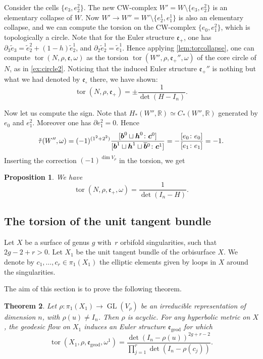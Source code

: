 \documentclass[10pt]{amsart}
\theoremstyle{plain}
\newtheorem{thm}{Theorem}[subsection]
\newtheorem{prop}[thm]{Proposition}
\theoremstyle{definition}
\theoremstyle{remark}
\newcommand{\R}{\mathbb{R}}
\newcommand{\geod}{\mathrm{geod}}
\DeclareMathOperator{\GL}{GL}
\numberwithin{equation}{section}
\DeclareMathOperator{\tor}{tor}
\begin{document}
Consider the cells $\{e_3, e_2^2\}$. The new CW-complex $W' = W \setminus \{e_3, e_2^2\}$ is an elementary collapse of $W$. Now $W' \to W'' = W' \setminus \{e_2^1, e_1^1\}$ is also an elementary collapse, and we can compute the torsion on the CW-complex $\{e_0, e_1^2\}$, which is topologically a circle.
Note that for the Euler structure $\mathfrak e_+$, one has $\partial_3 \widetilde e_3 = \widetilde e_2^2 + (1-h) \widetilde e_2^1$, and $\partial_2 \widetilde e_2^1 = \widetilde e_1^1$. Hence applying \cref{lem:torcollapse}, one can compute $\tor(N, \rho, \mathfrak e, \omega)$ as the torsion $\tor(W'', \rho, \mathfrak e_+'', \omega)$ of the core circle of $N$, as in \cref{ex:circle2}. Noticing that the induced Euler structure $\mathfrak e_+''$ is nothing but what we had denoted by $\mathfrak e_\circ$ there, we have shown:
\[
\tor(N,\rho, \mathfrak e_+) = \pm \frac 1 {\det(H -I_n)}.
\]

Now let us compute the sign. Note that $H_*(W'', \R) \simeq C_*(W'', \R)$ generated by $e_0$ and $e_1^2$. Moreover one has $\partial e_1^2 = 0$. Hence
\[
\check \tau(W'', \omega)= (-1)^{(1^2 + 2^2)} \frac{[\boldsymbol b^0 \sqcup \boldsymbol h^0 \colon \boldsymbol c^0]}{[\boldsymbol b^1 \sqcup \boldsymbol h^1 \sqcup \boldsymbol{\overline b}{}^0 \colon \boldsymbol c^1]}\\
=- \frac {[e_0\colon e_0]}{[e_1 \colon e_1]} = -1.
\]
Inserting the correction $(-1)^{\dim V_\rho}$ in the torsion, we get
\begin{prop}
\label{prop:torstorus}
We have
\[
\tor(N,\rho, \mathfrak e_+, \omega) = \dfrac 1 {\det(I_n - H)}.
\]
\end{prop}

\subsection{The torsion of the unit tangent bundle}
\label{subsec:Torsion}
Let $X$
be a surface of genus $g$ with~$r$ orbifold singularities, such that $2g-2+r>0$. Let $X_1$
be the unit tangent bundle of the orbisurface $X$. We denote by $c_1, \ldots, c_r\in\pi_1(X_1)$ the elliptic elements given by loops in $X$ around the singularities.

The aim of this section is to prove the following theorem.
\begin{thm}
\label{prop:torsion}
Let $\rho \colon \pi_1(X_1) \!\to\! \GL(V_\rho)$ be an irreducible representation of dimen\-sion $n$, with $\rho(u) \neq I_n$. Then $\rho$ is acyclic. For any hyperbolic metric on $X$, the geodesic flow on $X_1$ induces an Euler structure $\mathfrak e_{\geod}$ for which
\[
\tor(X_1, \rho, \mathfrak e_{\geod}, \omega^1) = \frac{\det(I_n - \rho(u))^{2g+r-2}}{\prod_{j=1}^r \det(I_n - \rho(c_j))}.
\]
\end{thm}
\end{document}
